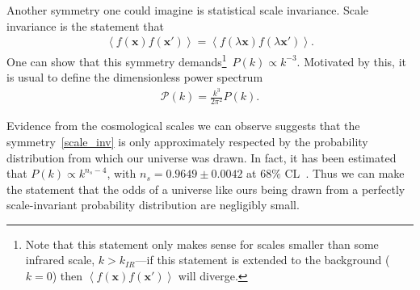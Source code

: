     Another symmetry one could imagine is statistical scale invariance.
    Scale invariance is the statement that
    \begin{align}\label{scale_inv}
        \left<f(\mathbf{x})f(\mathbf{x'})\right> = \left<f(\lambda\mathbf{x})f(\lambda\mathbf{x'})\right>.
    \end{align}
    One can show that this symmetry demands\footnote{
        Note that this statement only makes sense for scales smaller
        than some infrared scale, $k>k_{IR}$---if this statement is extended to
        the background ($k=0$) then $\left<f(\mathbf{x})f(\mathbf{x'})\right>$
        will diverge.
    }~$P(k)\propto k^{-3}$.
    Motivated by this, it is usual to define the dimensionless power spectrum
    \begin{align}\label{primpowerspec_defn}
        \mathcal{P}(k) = \frac{k^3}{2\pi^2}P(k).
    \end{align}


    Evidence from the cosmological scales we can observe
    suggests that the symmetry~\eqref{scale_inv} is 
    only approximately respected by the probability
    distribution from which our universe was drawn.
    In fact, it has been estimated that $P(k)\propto k^{n_s-4}$, with $n_s=0.9649 \pm 0.0042$
    at $68\%$ CL~\cite{Planck_inflation_2015, Planck_inflation_2018}.
    Thus we can make the statement that
    the odds of a universe like ours being drawn from a
    perfectly scale-invariant probability
    distribution are negligibly small.




